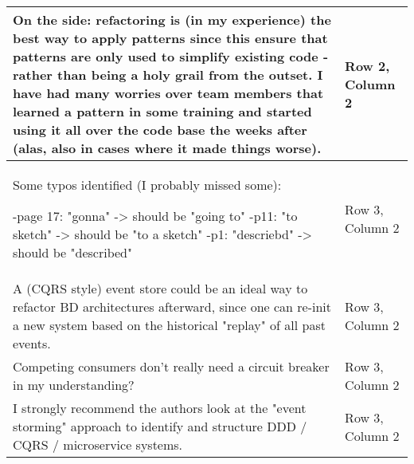 \documentclass{article}
\begin{document}
\begin{longtable}{|p{7cm}|p{7cm}|}
    On the side: refactoring is (in my experience) the best way to apply patterns since this ensure that patterns are only used to simplify existing code -  rather than being a holy grail from the outset. I  have had many worries over team members that learned a pattern in some training and started using it all over the code base the weeks after (alas, also in cases where it made things worse). & Row 2, Column 2 \\ \hline
    \rule[-1.5ex]{0pt}{4.5ex} Some typos identified (I probably missed some):

    -page 17: "gonna" -> should be "going to"
    -p11: "to sketch" -> should be "to a sketch"
    -p1: "descriebd" -> should be "described" & Row 3, Column 2 \\ \hline

    \rule[-1.5ex]{0pt}{4.5ex} A (CQRS style) event store could be an ideal way to refactor BD architectures afterward, since one can re-init a new system based on the historical "replay" of all past events. & Row 3, Column 2 \\ \hline
    \rule[-1.5ex]{0pt}{4.5ex} Competing consumers don't really need a circuit breaker in my understanding? & Row 3, Column 2 \\ \hline
    \rule[-1.5ex]{0pt}{4.5ex}
    I strongly recommend the authors look at the "event storming" approach to identify and structure DDD / CQRS / microservice systems. & Row 3, Column 2 \\ \hline


    \end{longtable}
\end{document}
